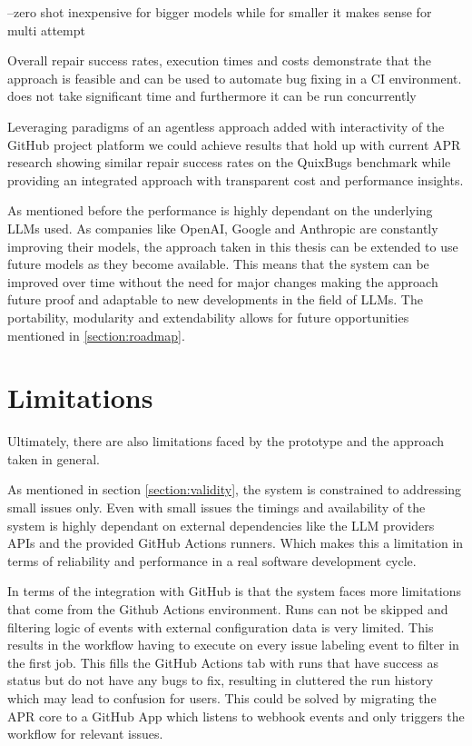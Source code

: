 --zero shot inexpensive for bigger models while for smaller it makes sense for multi attempt

Overall repair success rates, execution times and costs demonstrate that the approach is feasible and can be used to automate bug fixing in a CI environment.
does not take significant time and furthermore it can be run concurrently

Leveraging paradigms of an agentless approach added with interactivity of the GitHub project platform we could achieve results that hold up with current APR research \cite{huCanGPTO1Kill2024, } showing similar repair success rates on the QuixBugs benchmark while providing an integrated approach with transparent cost and performance insights.

As mentioned before the performance is highly dependant on the underlying LLMs used. As companies like OpenAI, Google and Anthropic are constantly improving their models, the approach taken in this thesis can be extended to use future models as they become available. This means that the system can be improved over time without the need for major changes making the approach future proof and adaptable to new developments in the field of LLMs. The portability, modularity and extendability allows for future opportunities mentioned in \ref{section:roadmap}.

\section{Limitations}
Ultimately, there are also limitations faced by the prototype and the approach taken in general.

As mentioned in section \ref{section:validity}, the system is constrained to addressing small issues only. Even with small issues the timings and availability of the system is highly dependant on external dependencies like the LLM providers APIs and the provided GitHub Actions runners. Which makes this a limitation in terms of reliability and performance in a real software development cycle.

In terms of the integration with GitHub is that the system faces more limitations that come from the Github Actions environment. Runs can not be skipped and filtering logic of events with external configuration data is very limited. This results in the workflow having to execute on every issue labeling event to filter in the first job. This fills the GitHub Actions tab with runs that have success as status but do not have any bugs to fix, resulting in cluttered the run history which may lead to confusion for users. This could be solved by migrating the APR core to a GitHub App which listens to webhook events and only triggers the workflow for relevant issues.

